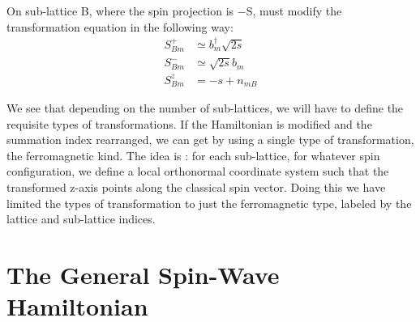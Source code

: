 On sub-lattice B, where the spin projection is $ \mathrm{-S} $, must modify the transformation equation in the following way:
\begin{equation}\label{eq28}
\begin{split}
S^+_{Bm} &\simeq b_m^\dagger\sqrt{2s}\\
S^-_{Bm} &\simeq  \sqrt{2s}b_m\\
S^z_{Bm} &= -s + n_{mB}
\end{split}
\end{equation}

We see that depending on the number of sub-lattices, we will have to define the requisite types of transformations. If the Hamiltonian is modified and the summation index rearranged, we can get by using a single type of transformation, the ferromagnetic kind. The idea is : for each sub-lattice, for whatever spin configuration, we define a local orthonormal coordinate system such that the transformed z-axis points along the classical spin vector. Doing this we have limited the types of transformation to just the ferromagnetic type, labeled by the lattice and sub-lattice indices. 

\section{The General Spin-Wave Hamiltonian}

